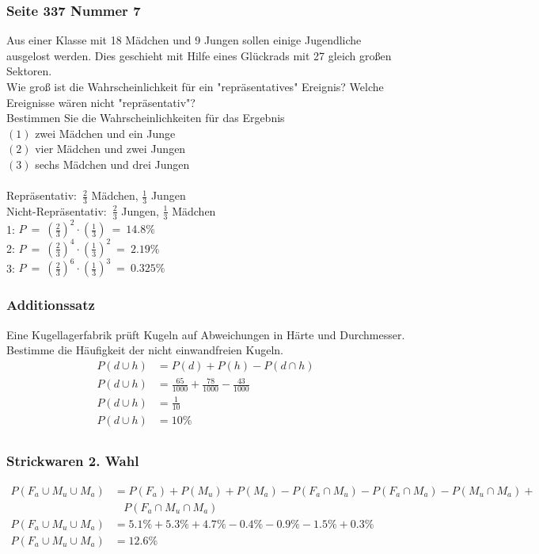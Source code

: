 \documentclass[a4paper,12pt]{article}
\begin{document}
\subsubsection*{Seite 337 Nummer 7}
Aus einer Klasse mit 18 Mädchen und 9 Jungen sollen einige Jugendliche ausgelost werden. Dies geschieht mit Hilfe eines Glückrads mit 27 gleich großen Sektoren.\\
Wie groß ist die Wahrscheinlichkeit für ein "repräsentatives" Ereignis? Welche Ereignisse wären nicht "repräsentativ"?\\
Bestimmen Sie die Wahrscheinlichkeiten für das Ergebnis\\
$(1)$ zwei Mädchen und ein Junge\\
$(2)$ vier Mädchen und zwei Jungen\\
$(3)$ sechs Mädchen und drei Jungen\\\\
Repräsentativ:\ $\frac{2}{3}$ Mädchen, $\frac{1}{3}$ Jungen\\
Nicht-Repräsentativ:\ $\frac{2}{3}$ Jungen, $\frac{1}{3}$ Mädchen\\
1: $P\ =\ (\frac{2}{3})^2 \cdot (\frac{1}{3})\ =\ 14.8\%$\\
2: $P\ =\ (\frac{2}{3})^4 \cdot (\frac{1}{3})^2\ =\ 2.19\%$\\
3: $P\ =\ (\frac{2}{3})^6 \cdot (\frac{1}{3})^3\ =\ 0.325\%$\\
\subsubsection*{Additionssatz}
Eine Kugellagerfabrik prüft Kugeln auf Abweichungen in Härte und Durchmesser.\\
Bestimme die Häufigkeit der nicht einwandfreien Kugeln. 
\begin{equation}
\begin{split}
P(d \cup h) & = P(d) + P(h) - P(d \cap h)\\
P(d \cup h) & = \frac{65}{1000} + \frac{78}{1000} - \frac{43}{1000}\\
P(d \cup h) & = \frac{1}{10}\\
P(d \cup h) & = 10 \%\\
\end{split}
\end{equation}
\subsubsection*{Strickwaren 2. Wahl}
\begin{equation}
\begin{split}
P(F_a \cup M_u \cup M_a) & = P(F_a) + P(M_u) + P(M_a) - P(F_a \cap M_u) - P(F_a \cap M_a) - P(M_u \cap M_a) + \\
&\ \ \ \ P(F_a \cap M_u \cap M_a)\\
P(F_a \cup M_u \cup M_a) & = 5.1 \% + 5.3 \% + 4.7 \% - 0.4 \% - 0.9 \% - 1.5 \% + 0.3 \% \\
P(F_a \cup M_u \cup M_a) & = 12.6 \% \\
\end{split}
\end{equation}
\end{document}
